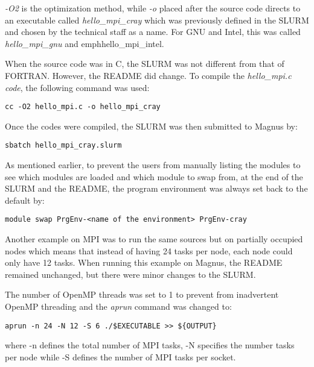 \emph{-O2} is the optimization method, while \emph{-o} placed after the source code directs to an executable called \emph{hello\_mpi\_cray} which was 
previously defined in the SLURM and chosen by the technical staff as a name. For GNU and Intel, this was called \emph{hello\_mpi\_gnu} and emph{hello\_mpi\_intel.} 

When the source code was in C, the SLURM was not different from that of FORTRAN. However, the README did change. To compile the \emph{hello\_mpi.c code}, the 
following command was used: 

\begin{tcolorbox}
\begin{Verbatim}[fontsize=\scriptsize]
cc -O2 hello_mpi.c -o hello_mpi_cray
\end{Verbatim}
\end{tcolorbox}

Once the codes were compiled, the SLURM was then submitted to Magnus by:

\begin{tcolorbox}
\begin{Verbatim}[fontsize=\scriptsize]
sbatch hello_mpi_cray.slurm 
\end{Verbatim}
\end{tcolorbox}

As mentioned earlier, to prevent the users from manually listing the modules to see which modules are loaded and which module to swap from, at the end
of the SLURM and the README, the program environment was always set back to the default by:

\begin{tcolorbox}
\begin{Verbatim}[fontsize=\scriptsize]
module swap PrgEnv-<name of the environment> PrgEnv-cray
\end{Verbatim}
\end{tcolorbox}

Another example on MPI was to run the same sources but on partially occupied nodes which means that instead of having 24 tasks per node, each node could
only have 12 tasks. When running this example on Magnus, the README remained unchanged, but there were minor changes to the SLURM.

The number of OpenMP threads was set to 1 to prevent from inadvertent OpenMP threading and the \emph{aprun} command was changed to:

\begin{tcolorbox}
\begin{Verbatim}[fontsize=\scriptsize]
aprun -n 24 -N 12 -S 6 ./$EXECUTABLE >> ${OUTPUT}
\end{Verbatim}
\end{tcolorbox}

where -n defines the total number of MPI tasks, -N specifies the number tasks per node while -S defines the number of MPI tasks per socket.

